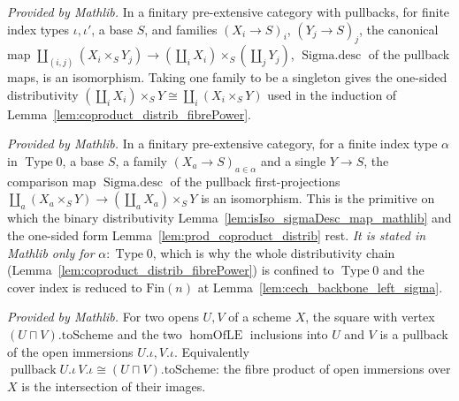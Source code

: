 \begin{lemma}
  \label{lem:isIso_sigmaDesc_map_mathlib}
  \mathlibok
  \textit{Provided by Mathlib.}
  In a finitary pre-extensive category with pullbacks, for finite index types \(\iota, \iota'\),
  a base \(S\), and families \((X_i \to S)_i\), \((Y_j \to S)_j\), the canonical map
  \(\coprod_{(i,j)} (X_i \times_S Y_j) \to (\coprod_i X_i) \times_S (\coprod_j Y_j)\),
  \(\operatorname{Sigma.desc}\) of the pullback maps, is an isomorphism. Taking one family to be a
  singleton gives the one-sided distributivity
  \((\coprod_i X_i) \times_S Y \cong \coprod_i (X_i \times_S Y)\) used in the induction of
  Lemma~\ref{lem:coproduct_distrib_fibrePower}.
\end{lemma}

\begin{lemma}
  \label{lem:isIso_sigmaDesc_fst_mathlib}
  \mathlibok
  \textit{Provided by Mathlib.}
  In a finitary pre-extensive category, for a finite index type \(\alpha\) in \(\operatorname{Type}
  0\), a base \(S\), a family \((X_a \to S)_{a \in \alpha}\) and a single \(Y \to S\), the comparison
  map \(\operatorname{Sigma.desc}\) of the pullback first-projections
  \(\coprod_a (X_a \times_S Y) \to (\coprod_a X_a) \times_S Y\) is an isomorphism. This is the
  primitive on which the binary distributivity Lemma~\ref{lem:isIso_sigmaDesc_map_mathlib} and the
  one-sided form Lemma~\ref{lem:prod_coproduct_distrib} rest. \emph{It is stated in Mathlib only for}
  \(\alpha : \operatorname{Type} 0\), which is why the whole distributivity chain
  (Lemma~\ref{lem:coproduct_distrib_fibrePower}) is confined to \(\operatorname{Type} 0\) and the
  cover index is reduced to \(\mathrm{Fin}(n)\) at Lemma~\ref{lem:cech_backbone_left_sigma}.
\end{lemma}

\begin{lemma}
  \label{lem:isPullback_opens_inf_mathlib}
  \mathlibok
  \textit{Provided by Mathlib.}
  For two opens \(U, V\) of a scheme \(X\), the square with vertex \((U \sqcap V).\mathrm{toScheme}\)
  and the two \(\operatorname{homOfLE}\) inclusions into \(U\) and \(V\) is a pullback of the open
  immersions \(U.\iota, V.\iota\). Equivalently \(\operatorname{pullback} U.\iota\,V.\iota \cong
  (U \sqcap V).\mathrm{toScheme}\): the fibre product of open immersions over \(X\) is the
  intersection of their images.
\end{lemma}

